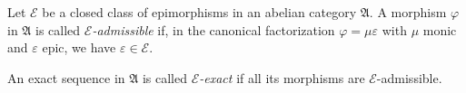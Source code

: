 Let $\mathcal{E}$ be a closed class of epimorphisms in an abelian category $\mathfrak{A}$. A morphism $\varphi$ in $\mathfrak{A}$ is called {\it $\mathcal{E}$-admissible} if, in the canonical factorization $\varphi = \mu \varepsilon$ with $\mu$ monic and $\varepsilon$ epic, we have $\varepsilon \in \mathcal{E}$.

An exact sequence in $\mathfrak{A}$ is called {\it $\mathcal{E}$-exact} if all its morphisms are $\mathcal{E}$-admissible.
